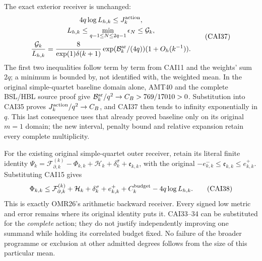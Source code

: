 \documentclass[11pt,a4paper]{article}
\begin{document}
The exact exterior receiver is unchanged:
\[
 \begin{gathered}
 4q\log L_{h,k}\le J_k^{\rm action},\\
 L_{h,k}\le\min_{q-1\le N\le2q-1}\epsilon_N\le\mathcal G_k,
 \\
 \frac{\mathcal G_k}{L_{h,k}}=
 \frac8{\exp(1)\delta(k+1)}\exp(\mathcal B_k^{\rm ar}/(4q))
                              (1+O_h(k^{-1})).\end{gathered}\tag{CAI37}
\]
The first two inequalities follow term by term from CAI11 and the
weights' sum $2q$; a minimum is bounded by, not identified with, the
weighted mean. In the original simple-quartet baseline domain alone,
AMT40 and the complete BSL/HBL source proof give
$\mathcal B_k^{\rm ar}/q^2\to C_B>769/17010>0$. Substitution into
CAI35 proves $J_k^{\rm action}/q^2\to C_B$, and CAI37 then tends to
infinity exponentially in $q$. This last consequence uses that already
proved baseline only on its original $m=1$ domain; the new interval,
penalty bound and relative expansion retain every complete multiplicity.

For the existing original simple-quartet outer receiver, retain its
literal finite identity
$\Psi_k=\mathcal F_{\partial,k}^{(k)}-\Phi_{k,k}
+\mathcal H_k+\delta_k^\sigma+\mathfrak e_{k,k}$, with the original
$-e_{k,k}^-\le\mathfrak e_{k,k}\le e_{k,k}^+$. Substituting CAI15 gives
\[
 \Phi_{k,k}\le\mathcal F_{\partial,k}^{(k)}+\mathcal H_k
       +\delta_k^\sigma+e_{k,k}^++C_k^{\rm budget}-4q\log L_{h,k}.
 \tag{CAI38}
\]
This is exactly OMR26's arithmetic backward receiver. Every signed low
metric and error remains where its original identity puts it. CAI33--34
can be substituted for the \emph{complete} action; they do not justify
independently improving one summand while holding its correlated budget
fixed. No failure of the broader programme or exclusion at other
admitted degrees follows from the size of this particular mean.
\end{document}
